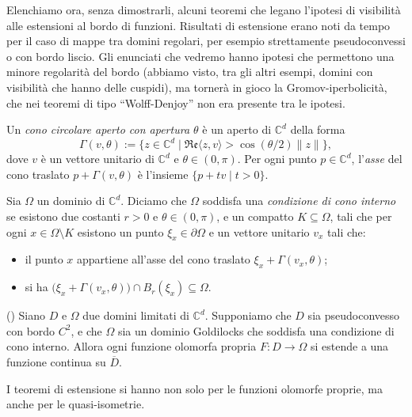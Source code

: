 Elenchiamo ora, senza dimostrarli, alcuni teoremi che legano l'ipotesi di visibilità alle estensioni al bordo di funzioni. Risultati di estensione erano noti da tempo per il caso di mappe tra domini regolari, per esempio strettamente pseudoconvessi o con bordo liscio. Gli enunciati che vedremo hanno ipotesi che permettono una minore regolarità del bordo (abbiamo visto, tra gli altri esempi, domini con visibilità che hanno delle cuspidi), ma tornerà in gioco la Gromov-iperbolicità, che nei teoremi di tipo ``Wolff-Denjoy'' non era presente tra le ipotesi.

\begin{defn}
    Un \textit{cono circolare aperto con apertura $\theta$} è un aperto di $\mathbb{C}^d$ della forma
    $$\Gamma(v,\theta):=\{z\in\mathbb{C}^d\mid \mathfrak{Re}\langle z,v\rangle>\cos(\theta/2)\|z\|\},$$
    dove $v$ è un vettore unitario di $\mathbb{C}^d$ e $\theta\in(0,\pi)$. Per ogni punto $p\in\mathbb{C}^d$, l'\textit{asse} del cono traslato $p+\Gamma(v,\theta)$ è l'insieme $\{p+tv\mid t>0\}$.
\end{defn}

\begin{defn}
    Sia $\Omega$ un dominio di $\mathbb{C}^d$. Diciamo che $\Omega$ soddisfa una \textit{condizione di cono interno} se esistono due costanti $r>0$ e $\theta\in(0,\pi)$, e un compatto $K\subseteq\Omega$, tali che per ogni $x\in\Omega\setminus K$ esistono un punto $\xi_x\in\partial\Omega$ e un vettore unitario $v_x$ tali che:
    \begin{itemize}
        \item il punto $x$ appartiene all'asse del cono traslato $\xi_x+\Gamma(v_x,\theta)$;
        \item si ha $\big(\xi_x+\Gamma(v_x,\theta)\big)\cap B_r(\xi_x)\subseteq\Omega$.
    \end{itemize}
\end{defn}

\begin{thm}
    (\cite[Theorem 1.5]{BZ1}) Siano $D$ e $\Omega$ due domini limitati di $\mathbb{C}^d$. Supponiamo che $D$ sia pseudoconvesso con bordo $C^2$, e che $\Omega$ sia un dominio Goldilocks che soddisfa una condizione di cono interno. Allora ogni funzione olomorfa propria $F:D\longrightarrow\Omega$ si estende a una funzione continua su $\overline{D}$.
\end{thm}

I teoremi di estensione si hanno non solo per le funzioni olomorfe proprie, ma anche per le quasi-isometrie.

